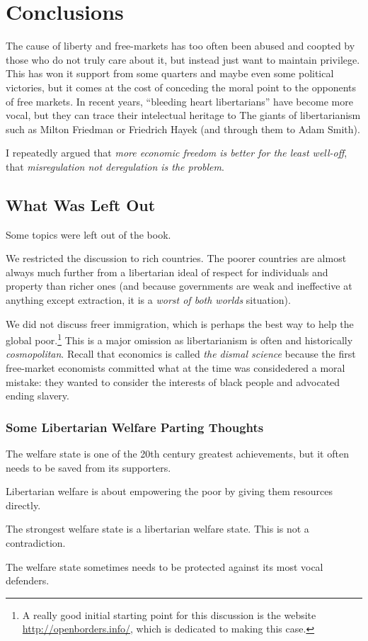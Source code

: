 \chapter{Conclusions}

The cause of liberty and free-markets has too often been abused and coopted by
those who do not truly care about it, but instead just want to maintain
privilege. This has won it support from some quarters and maybe even some
political victories, but it comes at the cost of conceding the moral point to
the opponents of free markets. In recent years, ``bleeding heart libertarians''
have become more vocal, but they can trace their intelectual heritage to The
giants of libertarianism such as Milton Friedman or Friedrich Hayek (and
through them to Adam Smith).

I repeatedly argued that \emph{more economic freedom is better for the least
well-off}, that \emph{misregulation not deregulation is the problem}.

\section{What Was Left Out}

Some topics were left out of the book.

We restricted the discussion to rich countries. The poorer countries are almost
always much further from a libertarian ideal of respect for individuals and
property than richer ones (and because governments are weak and ineffective at
anything except extraction, it is a \emph{worst of both worlds} situation).

We did not discuss freer immigration, which is perhaps the best way to help the
global poor.\footnote{A really good initial starting point for this discussion
is the website \url{http://openborders.info/}, which is dedicated to making
this case.} This is a major omission as libertarianism is often and
historically \emph{cosmopolitan}. Recall that economics is called \emph{the
dismal science} because the first free-market economists committed what at the
time was considedered a moral mistake: they wanted to consider the interests of
black people and advocated ending slavery.

\subsection{Some Libertarian Welfare Parting Thoughts}

\thought The welfare state is one of the 20th century greatest achievements,
but it often needs to be saved from its supporters.

\thought Libertarian welfare is about empowering the poor by giving them
resources directly.

\thought The strongest welfare state is a libertarian welfare state. This is
not a contradiction.

\thought The welfare state sometimes needs to be protected against its most
vocal defenders.

